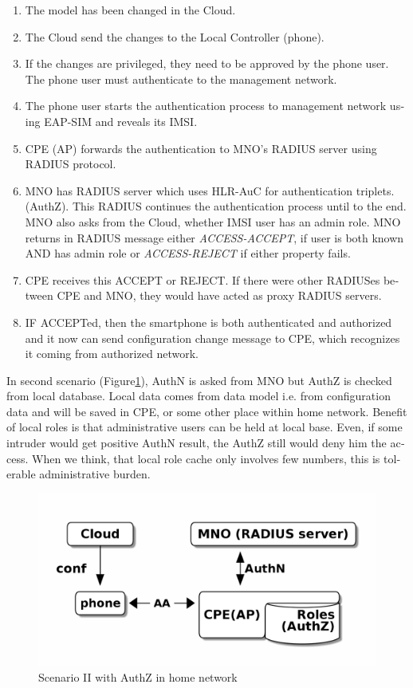 \documentclass[12pt,a4paper,english]{tutthesis}
\begin{document}
\begin{otherlanguage}{english}
\begin{enumerate}
\item The model has been changed in the Cloud.
\item The Cloud send the changes to the Local Controller (phone).
\item If the changes are privileged, they need to be approved by the phone user.
The phone user must  authenticate to the management network.
\item The phone user starts the authentication process to management
network using EAP-SIM and reveals its IMSI.
\item CPE (AP) forwards the authentication to MNO's RADIUS server using
RADIUS protocol.
\item MNO has RADIUS server which uses HLR-AuC for authentication
  triplets. 
  (AuthZ). This RADIUS continues the authentication process until to
  the end. 
MNO also asks from the Cloud, whether IMSI user has an admin role.
MNO returns in RADIUS message either \emph{ACCESS-ACCEPT}, if user is both
  known AND has admin role  or \emph{ACCESS-REJECT} if either property
  fails.
\item CPE receives this ACCEPT or REJECT. If there were other RADIUSes
between CPE and MNO, they would have acted
as proxy RADIUS servers.
\item IF ACCEPTed, then the smartphone is both authenticated and
authorized and it now 
can send configuration change message to CPE, which recognizes it
coming from authorized  network.
\end{enumerate}







\label{scenario-ii}

In second scenario (Figure\ref{fig:scenario-II}), AuthN is asked from MNO but
AuthZ is checked from local database. Local data comes from data model
i.e. from configuration data and will be saved in CPE, or some other
place within home network. Benefit of local roles is that
administrative users can be held at local base. Even, if some intruder
would get positive AuthN result, the AuthZ still would deny him the access.
When we think, that local role cache only involves few numbers, this
is tolerable administrative burden.


\begin{figure}[htb]
\centering
\includegraphics[width=.9\linewidth]{scenII.png}
\caption{\label{fig:scenario-II}Scenario II with AuthZ in home network}
\end{figure}



\end{otherlanguage}
\end{document}
